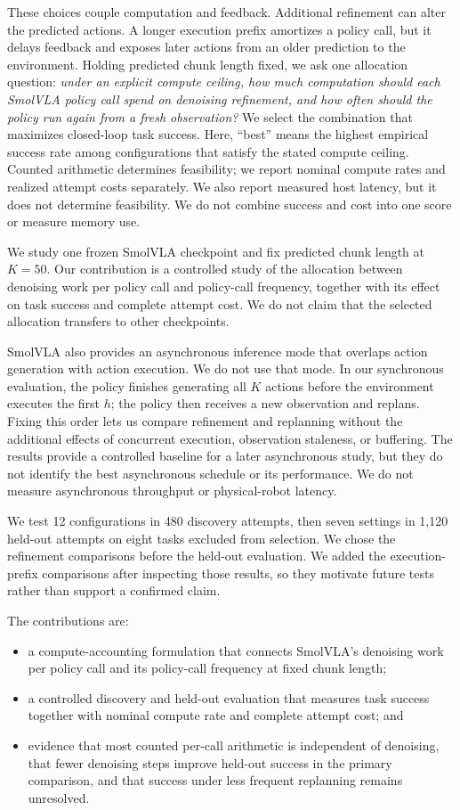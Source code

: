 \documentclass{article}
\begin{document}
These choices couple computation and feedback. Additional refinement can alter
the predicted actions. A longer execution prefix amortizes a policy call, but it
delays feedback and exposes later actions from an older prediction to the
environment. Holding predicted chunk length fixed, we ask one allocation
question: \emph{under an explicit compute ceiling, how much computation should
each SmolVLA policy call spend on denoising refinement, and how often should the
policy run again from a fresh observation?} We select the combination that
maximizes closed-loop task success. Here, ``best'' means the highest
empirical success rate among configurations that satisfy the stated compute
ceiling. Counted arithmetic determines feasibility; we report nominal compute
rates and realized attempt costs separately. We also report measured host
latency, but it does not determine feasibility. We do not combine success and
cost into one score or measure memory use.

We study one frozen SmolVLA checkpoint \cite{smolvla} and fix predicted chunk
length at $K=50$. Our contribution is a controlled study of the allocation
between denoising work per policy call and policy-call frequency, together with
its effect on task success and complete attempt cost. We do not claim that the
selected allocation transfers to other checkpoints.

SmolVLA also provides an asynchronous inference mode that overlaps action
generation with action execution. We do not use that mode. In our synchronous
evaluation, the policy finishes generating all $K$ actions before the
environment executes the first $h$; the policy then receives a new observation
and replans. Fixing this order lets us compare refinement and replanning without
the additional effects of concurrent execution, observation staleness, or
buffering. The results provide a controlled baseline for a later asynchronous
study, but they do not identify the best asynchronous schedule or its
performance. We do not measure asynchronous throughput or physical-robot
latency.

We test 12 configurations in 480 discovery attempts, then seven settings in
1,120 held-out attempts on eight tasks excluded from selection. We chose the
refinement comparisons before the held-out evaluation. We added the
execution-prefix comparisons after inspecting those results, so they motivate
future tests rather than support a confirmed claim.

The contributions are:
\begin{itemize}[leftmargin=*,nosep]
    \item a compute-accounting formulation that connects SmolVLA's denoising
    work per policy call and its policy-call frequency at fixed chunk length;
    \item a controlled discovery and held-out evaluation that measures task
    success together with nominal compute rate and complete attempt cost; and
    \item evidence that most counted per-call arithmetic is independent of
    denoising, that fewer denoising steps improve held-out success in the
    primary comparison, and that success under less frequent replanning remains
    unresolved.
\end{itemize}
\end{document}
